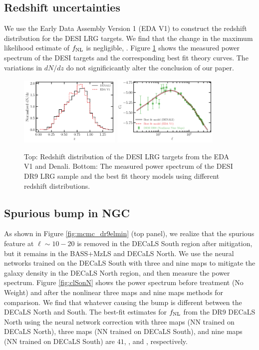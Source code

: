 \subsection{Redshift uncertainties}\label{ssec:nzuncer}
We use the Early Data Assembly Version 1 (EDA V1) to construct the redshift distribution for the DESI LRG targets. We find that the change in the maximum likelihood estimate of $f_{\rm NL}$ is negligible, . Figure \ref{fig:cl_nz} shows the measured power spectrum of the DESI targets and the corresponding best fit theory curves. The variations in $dN/dz$ do not significicantly alter the conclusion of our paper.
\begin{figure}
\raggedleft
\includegraphics[width=0.43\textwidth]{figures/nz_lrg_eda.pdf}
\includegraphics[width=0.45\textwidth]{figures/cl_nz.pdf}\caption{Top: Redshift distribution of the DESI LRG targets from the EDA V1 and Denali. Bottom: The measured power spectrum of the DESI DR9 LRG sample and the best fit theory models using different redshift distributions.}\label{fig:cl_nz}
\end{figure}




\subsection{Spurious bump in NGC}\label{ssec:ndecalsbump}
As shown in Figure \ref{fig:mcmc_dr9elmin} (top panel), we realize that the spurious feature at $\ell \sim 10-20$ is removed in the DECaLS South region after mitigation, but it remains in the BASS+MzLS and DECaLS North. We use the neural networks trained on the DECaLS South with three and nine maps to mitigate the galaxy density in the DECaLS North region, and then measure the power spectrum. Figure \ref{fig:clSonN} shows the power spectrum before treatment (No Weight) and after the nonlinear three maps and nine maps methods for comparison. We find that whatever causing the bump is different between the DECaLS North and South. The best-fit estimates for $f_{\rm NL}$ from the DR9 DECaLS North using the neural network correction with three maps (NN trained on DECaLS North), three maps (NN trained on DECaLS South), and nine maps (NN trained on DECaLS South) are $41$, , and , respectively. 

